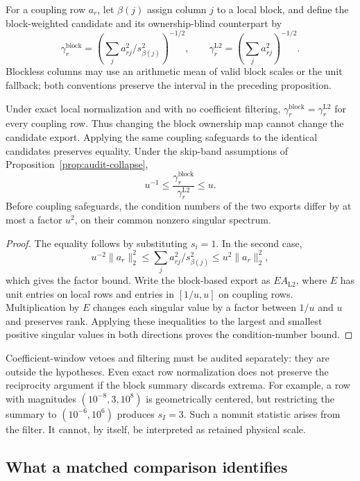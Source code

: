 For a coupling row $a_r$, let $\beta(j)$ assign column $j$ to a local block, and
define the block-weighted candidate and its ownership-blind counterpart by
\[
 \gamma_r^{\mathrm{block}}
 =\left(\sum_j a_{rj}^2/s_{\beta(j)}^2\right)^{-1/2},
 \qquad
 \gamma_r^{\mathrm{L2}}=\left(\sum_j a_{rj}^2\right)^{-1/2}.
\]
Blockless columns may use an arithmetic mean of valid block scales or the unit
fallback; both conventions preserve the interval in the preceding proposition.

\begin{auditproposition}
\label{prop:audit-ownership}
Under exact local normalization and with no coefficient filtering,
$\gamma_r^{\mathrm{block}}=\gamma_r^{\mathrm{L2}}$ for every coupling row. Thus
changing the block ownership map cannot change the candidate export. Applying
the same coupling safeguards to the identical candidates preserves equality.
Under the skip-band assumptions of Proposition~\ref{prop:audit-collapse},
\[
 u^{-1}\leq\frac{\gamma_r^{\mathrm{block}}}
                       {\gamma_r^{\mathrm{L2}}}\leq u.
\]
Before coupling safeguards, the condition numbers of the two exports differ by
at most a factor $u^2$, on their common nonzero singular spectrum.
\end{auditproposition}
\begin{proof}
The equality follows by substituting $s_i=1$. In the second case,
\[
 u^{-2}\|a_r\|_2^2\leq\sum_j a_{rj}^2/s_{\beta(j)}^2
 \leq u^2\|a_r\|_2^2,
\]
which gives the factor bound. Write the block-based export as $EA_{\mathrm{L2}}$,
where $E$ has unit entries on local rows and entries in $[1/u,u]$ on coupling
rows. Multiplication by $E$ changes each singular value by a factor between
$1/u$ and $u$ and preserves rank. Applying these inequalities to the largest and
smallest positive singular values in both directions proves the condition-number
bound.
\end{proof}

Coefficient-window vetoes and filtering must be audited separately: they are
outside the hypotheses. Even exact row normalization does not preserve the
reciprocity argument if the block summary discards extrema. For example, a row
with magnitudes $(10^{-8},3,10^8)$ is geometrically centered, but restricting the
summary to $(10^{-6},10^6)$ produces $s_I=3$. Such a nonunit statistic arises
from the filter. It cannot, by itself, be interpreted as retained physical scale.

\subsection{What a matched comparison identifies}

